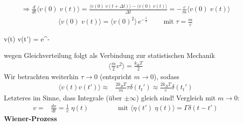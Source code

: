 \documentclass[12pt]{article}
\begin{document}
\begin{align*}
\Rightarrow \frac{d}{dt} \langle v(0) \; v(t) \rangle 
= \frac{\langle v(0) \; v(t+ \Delta t) \rangle - \langle v(0) \; v(t) \rangle}{\Delta t} = - \frac{c}{m} \langle v(0) \; v(t) \rangle 
\end{align*}
\begin{align*}
\langle v(0) \; v(t) \rangle = \langle v(0)^2 \rangle \, e^{-\frac{t}{\tau}} \qquad \text{ mit } \tau = \frac{m}{c}
\end{align*}

\begin{tcolorbox}[ams align, title= Autokorrelationsfunktion , colback=blue!10!white, colframe=blue!30!black] 
\langle v(t) \; v(t') \rangle =  e^{- }
\end{tcolorbox}
wegen Gleichverteilung folgt als Verbindung zur statistischen Mechanik
\begin{align*}
\langle \frac{m}{2} v^2 \rangle = \frac{k_B T}{2} 
\end{align*}
Wir betrachten weiterhin $\tau \to 0$ (entspricht $ m\to 0$), sodass
\begin{align*}
\langle v(t) v(t') \rangle \approx & \frac{2 k_B T}{m} \tau \delta (t_t') \approx \frac{2 k_B T}{c} \delta (t_t') 
\end{align*}
Letzteres im Sinne, dass Integrale (über $\pm \infty$) gleich sind! Vergleich mit $m \to 0$:
\begin{align*}
v=& \frac{dx}{dt}= \frac{1}{c} \; \eta (t) \qquad \qquad \mbox{ mit } \langle \eta (t')  \; \eta (t) \rangle = \Gamma \delta (t-t') 
\end{align*}
\textbf{Wiener-Prozess}
\end{document}
